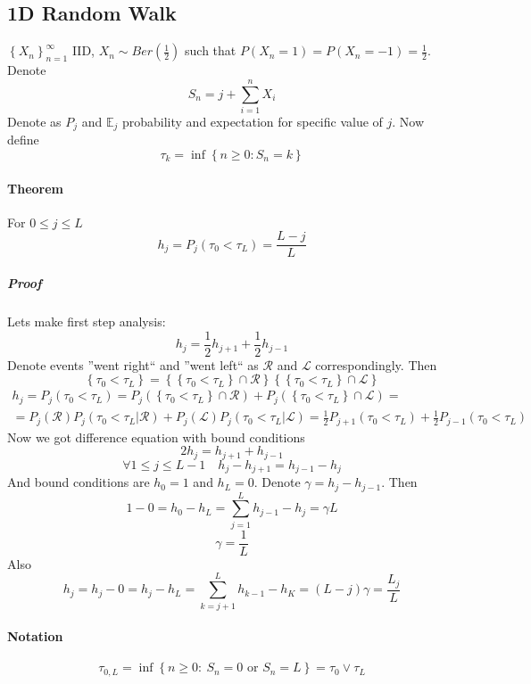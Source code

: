\subsection{1D Random Walk}
$\left\{ X_n \right\}_{n=1}^\infty$ IID, $X_n \sim Ber\left(\frac{1}{2}\right)$ such that $P\left(X_n = 1\right) = P\left(X_n = -1\right) = \frac{1}{2}$. Denote
$$S_n = j + \sum_{i=1}^n X_i$$
Denote as $P_j$ and $\mathbb{E}_j$ probability and expectation for specific value of $j$.
Now define 
$$\tau_k = \inf \left\{ n \geq 0: S_n = k \right\}$$
\paragraph{Theorem}
For $0\leq j \leq L$
$$h_j = P_j(\tau_0 < \tau_L) = \frac{L-j}{L}$$
\subparagraph{Proof}
Lets make first step analysis:
$$h_j = \frac{1}{2} h_{j+1} + \frac{1}{2} h_{j-1}$$
Denote events ''went right`` and ''went left`` as $\mathcal{R}$ and $\mathcal{L}$ correspondingly. Then
$$
\left\{ \tau_0 < \tau_L \right\} = \left\{ \left\{ \tau_0 < \tau_L \right\}  \cap \mathcal{R} \right\}\left\{ \left\{ \tau_0 < \tau_L \right\}  \cap \mathcal{L} \right\}$$
\begin{align*}h_j = P_j(\tau_0 < \tau_L) = P_j \left(\left\{ \tau_0 < \tau_L \right\}  \cap \mathcal{R}\right) + P_j \left(\left\{ \tau_0 < \tau_L \right\}  \cap \mathcal{L}\right) =\\= P_j(\mathcal{R})P_j \left(\tau_0 < \tau_L |  \mathcal{R}\right) + P_j(\mathcal{L})P_j \left(\tau_0 < \tau_L |  \mathcal{L}\right) = \frac{1}{2} P_{j+1} \left(\tau_0 < \tau_L \right) + \frac{1}{2} P_{j-1} \left(\tau_0 < \tau_L \right)
\end{align*}
Now we got difference equation with bound conditions
$$2h_j = h_{j+1} + h_{j-1}$$
$$\forall  1\leq j \leq L-1 \quad h_j - h_{j+1} = h_{j-1} - h_j$$
And bound conditions are
$h_0=1$ and $h_L=0$. Denote $\gamma = h_j - h_{j-1}$. Then
$$1-0 = h_0 - h_L = \sum_{j=1}^L h_{j-1} - h_j = \gamma L$$
$$\gamma = \frac{1}{L}$$
Also
$$h_j = h_j - 0 = h_j - h_L = \sum_{k=j+1}^L  h_{k-1} - h_K = (L-j)\gamma = \frac{L_j}{L}$$
\paragraph{Notation}
$$\tau_{0,L} = \inf  \left\{ n \geq 0 : \: S_n=0 \text{ or } S_n = L \right\} = \tau_{0} \lor \tau_L$$
